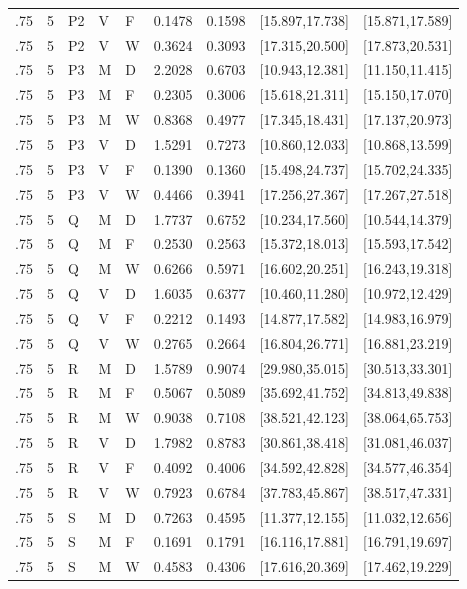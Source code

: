 {\begin{longtable}{rrlllrrll}
.75 & 5 & P2 & V & F & 0.1478 & 0.1598 & [15.897,17.738] & [15.871,17.589]\\
.75 & 5 & P2 & V & W & 0.3624 & 0.3093 & [17.315,20.500] & [17.873,20.531]\\
.75 & 5 & P3 & M & D & 2.2028 & 0.6703 & [10.943,12.381] & [11.150,11.415]\\
.75 & 5 & P3 & M & F & 0.2305 & 0.3006 & [15.618,21.311] & [15.150,17.070]\\
.75 & 5 & P3 & M & W & 0.8368 & 0.4977 & [17.345,18.431] & [17.137,20.973]\\
.75 & 5 & P3 & V & D & 1.5291 & 0.7273 & [10.860,12.033] & [10.868,13.599]\\
.75 & 5 & P3 & V & F & 0.1390 & 0.1360 & [15.498,24.737] & [15.702,24.335]\\
.75 & 5 & P3 & V & W & 0.4466 & 0.3941 & [17.256,27.367] & [17.267,27.518]\\
.75 & 5 & Q & M & D & 1.7737 & 0.6752 & [10.234,17.560] & [10.544,14.379]\\
.75 & 5 & Q & M & F & 0.2530 & 0.2563 & [15.372,18.013] & [15.593,17.542]\\
.75 & 5 & Q & M & W & 0.6266 & 0.5971 & [16.602,20.251] & [16.243,19.318]\\
.75 & 5 & Q & V & D & 1.6035 & 0.6377 & [10.460,11.280] & [10.972,12.429]\\
.75 & 5 & Q & V & F & 0.2212 & 0.1493 & [14.877,17.582] & [14.983,16.979]\\
.75 & 5 & Q & V & W & 0.2765 & 0.2664 & [16.804,26.771] & [16.881,23.219]\\
.75 & 5 & R & M & D & 1.5789 & 0.9074 & [29.980,35.015] & [30.513,33.301]\\
.75 & 5 & R & M & F & 0.5067 & 0.5089 & [35.692,41.752] & [34.813,49.838]\\
.75 & 5 & R & M & W & 0.9038 & 0.7108 & [38.521,42.123] & [38.064,65.753]\\
.75 & 5 & R & V & D & 1.7982 & 0.8783 & [30.861,38.418] & [31.081,46.037]\\
.75 & 5 & R & V & F & 0.4092 & 0.4006 & [34.592,42.828] & [34.577,46.354]\\
.75 & 5 & R & V & W & 0.7923 & 0.6784 & [37.783,45.867] & [38.517,47.331]\\
.75 & 5 & S & M & D & 0.7263 & 0.4595 & [11.377,12.155] & [11.032,12.656]\\
.75 & 5 & S & M & F & 0.1691 & 0.1791 & [16.116,17.881] & [16.791,19.697]\\
.75 & 5 & S & M & W & 0.4583 & 0.4306 & [17.616,20.369] & [17.462,19.229]\\

\end{longtable}}
